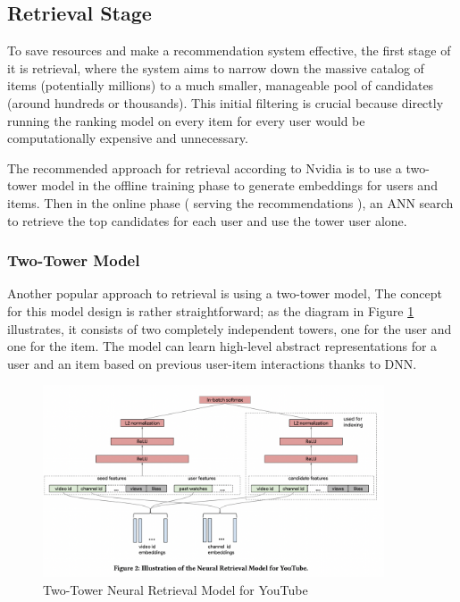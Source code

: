 \subsection{Retrieval Stage}

To save resources and make a recommendation system effective, the first stage of it is retrieval, 
where the system aims to narrow down the massive 
catalog of items (potentially millions) to a much smaller, 
manageable pool of candidates (around hundreds or thousands).
This initial filtering is crucial because 
directly running the ranking model on every item for every 
user would be computationally expensive and unnecessary.

The recommended approach for retrieval according to Nvidia \cite{NvidiaFeatureStores} is to use a two-tower model in the offline training phase to generate embeddings for users and items.
Then in the online phase ( serving the recommendations ), an ANN search to retrieve the top candidates for each user and use the tower user alone.

\subsubsection{Two-Tower Model}

Another popular approach to retrieval is using a two-tower model, 
The concept for this model design is rather straightforward; as the diagram in Figure \ref{fig: TwoTowerModel} illustrates, it consists of two completely independent towers, 
one for the user and one for the item. 
The model can learn high-level abstract representations for a user and an item 
based on previous user-item interactions thanks to DNN. 

\begin{figure}[H]
    \centering
    \includegraphics[width=0.9\textwidth]{assets/two_tower.png}
    \caption[Two-Tower Neural Retrieval Model for YouTube]{Two-Tower Neural Retrieval Model for YouTube \cite{YoutubeTwoTower}}
    \label{fig: TwoTowerModel}
\end{figure}

